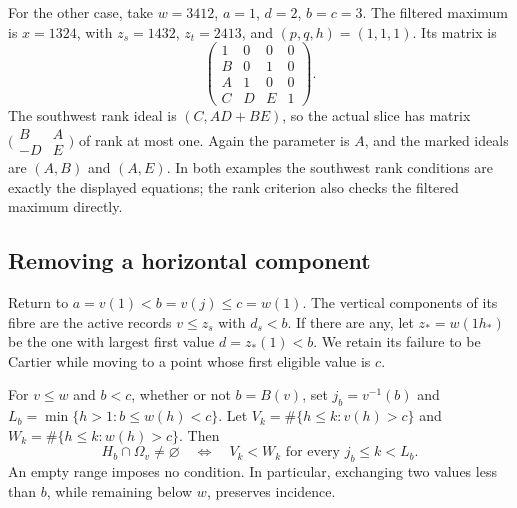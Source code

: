 For the other case, take $w=3412$, $a=1$,
$d=2$, $b=c=3$. The filtered maximum is $x=1324$, with $z_s=1432$,
$z_t=2413$, and $(p,q,h)=(1,1,1)$. Its matrix is
\[
 \begin{pmatrix}
 1&0&0&0\\B&0&1&0\\A&1&0&0\\C&D&E&1
 \end{pmatrix}.
\]
The southwest rank ideal is $(C,AD+BE)$, so the actual slice has
matrix $\bigl(\begin{smallmatrix}B&A\\-D&E\end{smallmatrix}\bigr)$ of rank
at most one. Again the parameter is $A$, and the marked ideals are
$(A,B)$ and $(A,E)$. In both examples the southwest rank conditions
are exactly the displayed equations; the rank criterion also checks
the filtered maximum directly.

\subsection{Removing a horizontal component}

Return to $a=v(1)<b=v(j)\leq c=w(1)$. The vertical components of
its fibre are the active records $v\leq z_s$ with $d_s<b$.
If there are any, let $z_*=w(1h_*)$ be the one with largest first
value $d=z_*(1)<b$. We retain its failure to be Cartier while
moving to a point whose first eligible value is $c$.

\begin{lemma}\label{ta:incidence}
For $v\leq w$ and $b<c$, whether or not $b=B(v)$, set
$j_b=v^{-1}(b)$ and $L_b=\min\{h>1:b\leq w(h)<c\}$.
Let $V_k=\#\{h\leq k:v(h)>c\}$ and
$W_k=\#\{h\leq k:w(h)>c\}$. Then
\[
 H_b\cap\Omega_v\neq\varnothing
 \quad\Longleftrightarrow\quad
 V_k<W_k\text{ for every }j_b\leq k<L_b.
\]
An empty range imposes no condition. In particular, exchanging two
values less than $b$, while remaining below $w$, preserves incidence.
\end{lemma}

